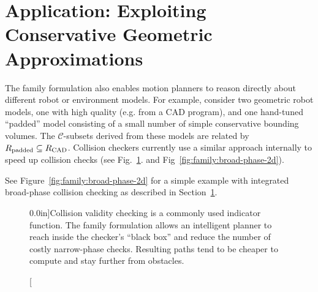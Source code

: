 \section{Application: Exploiting Conservative Geometric Approximations}
\label{subsec:family:broad-phase}

The family formulation also enables motion planners to
reason directly about different robot or environment models.
For example, consider two geometric robot models,
one with high quality (e.g. from a CAD program),
and one hand-tuned ``padded'' model consisting of 
a small number of simple conservative bounding volumes.
The $\mathcal{C}$-subsets derived from these models
are related by $R_{\mbox{\scriptsize padded}} \subseteq R_{\mbox{\scriptsize CAD}}$.
Collision checkers currently use a similar approach internally
to speed up collision checks (see Fig.~\ref{fig:family:broad-phase}.
and Fig~\ref{fig:family:broad-phase-2d}).

See Figure~\ref{fig:family:broad-phase-2d}
for a simple example with integrated broad-phase collision checking
as described in Section~\ref{subsec:family:broad-phase}.

\begin{figure}[b]
   \centering
   
   \quad%
   
   \caption[][0.0in]{Collision validity checking is a commonly used
     indicator function.
     The family formulation allows an intelligent planner to
     reach inside the checker's ``black box'' and reduce the number
     of costly narrow-phase checks.
     Resulting paths tend to be cheaper to compute and
     stay further from obstacles.}
   \label{fig:family:broad-phase}
\end{figure}


